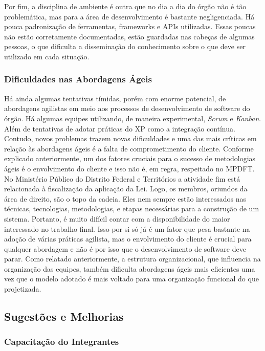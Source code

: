 \documentclass[
	article,			%
	11pt,				%
	oneside,			%
	a4paper,			%
	english,			%
	brazil,				%
	sumario=tradicional
	]{abntex2}
\begin{document}
Por fim, a disciplina de ambiente é outra que no dia a dia do órgão não é tão
problemática, mas para a área de desenvolvimento é bastante negligenciada. Há
pouca padronização de ferramentas, frameworks e APIs utilizadas. Essas poucas
não estão corretamente documentadas, estão guardadas nas cabeças de algumas
pessoas, o que dificulta a disseminação do conhecimento sobre o que deve ser
utilizado em cada situação.

\subsubsection{Dificuldades nas Abordagens Ágeis}

Há ainda algumas tentativas tímidas, porém com enorme potencial, de abordagens
agilistas em meio aos processos de desenvolvimento de software do órgão. Há
algumas equipes utilizando, de maneira experimental, \textit{Scrum} e
\textit{Kanban}. Além de tentativas de adotar práticas do XP como a integração
contínua. Contudo, novos problemas trazem novas dificuldades e uma das mais
críticas em relação às abordagens ágeis é a falta de comprometimento do cliente.
Conforme explicado anteriormente, um dos fatores cruciais para o sucesso de
metodologias ágeis é o envolvimento do cliente e isso não é, em regra,
respeitado no MPDFT. No Ministério Público do Distrito Federal e Territórios a
atividade fim está relacionada à fiscalização da aplicação da Lei. Logo, os
membros, oriundos da área de direito, são o topo da cadeia. Eles nem sempre
estão interessados nas técnicas, tecnologias, metodologias, e etapas necessárias
para a construção de um sistema. Portanto, é muito difícil contar com a
disponibilidade do maior interessado no trabalho final. Isso por si só já é um
fator que pesa bastante na adoção de várias práticas agilista, mas o
envolvimento do cliente é crucial para qualquer abordagem e não é por isso que o
desenvolvimento de software deve parar. Como relatado anteriormente, a estrutura
organizacional, que influencia na organização das equipes, também dificulta
abordagens ágeis mais eficientes uma vez que o modelo adotado é mais voltado
para uma organização funcional do que projetizada.

\subsection{Sugestões e Melhorias}

\subsubsection{Capacitação do Integrantes}
\end{document}
